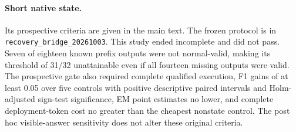 \paragraph{Short native state.} Its prospective criteria are given in the main text. The frozen protocol is \protect{} in \texttt{recovery\_bridge\_20261003}. This study ended incomplete and did not pass. Seven of eighteen known prefix outputs were not normal-valid, making its threshold of 31/32 unattainable even if all fourteen missing outputs were valid. The prospective gate also required complete qualified execution, F1 gains of at least 0.05 over five controls with positive descriptive paired intervals and Holm-adjusted sign-test significance, EM point estimates no lower, and complete deployment-token cost no greater than the cheapest nonstate control. The post hoc visible-answer sensitivity does not alter these original criteria.

